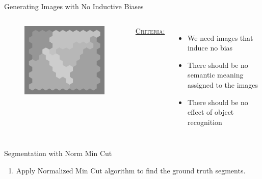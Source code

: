 \documentclass[10pt,xcolor=svgnames]{beamer} %
\begin{document}
\begin{frame}{Generating Images with No Inductive Biases}
\begin{columns}
\begin{figure}
        \includegraphics[width=\textwidth]{pictures/grid_init3.png}
    \end{figure}
    
    \underline{\textsc{Criteria:}}
    \begin{itemize}
        \item We need images that induce no bias
        \item There should be no semantic meaning assigned to the images
        \item There should be no effect of object recognition
    \end{itemize}  

    \end{columns}
\end{frame}

\begin{frame}{Segmentation with Norm Min Cut}
\begin{enumerate}
    \item Apply Normalized Min Cut algorithm to find the ground truth segments.
\end{enumerate}
\end{frame}
\end{document}
